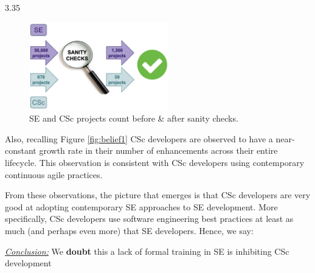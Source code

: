 \documentclass[conference,10pt]{IEEEtran}
\newenvironment{RQ}{\vspace{1mm}\begin{tcolorbox}[enhanced,width=3.4in,size=fbox,colback=red!5!white,drop shadow southeast,sharp corners]}{\end{tcolorbox}}
\begin{document}
\centerline{  3.35 }

\begin{figure}
  \centering
  \includegraphics[width=0.9\linewidth, height=1.5in]{img/sanity.png} 
  \caption{SE and CSc projects count before \& after sanity checks.}
  \label{fig:sanity}
  \vspace{-10pt}
\end{figure}
 Also, recalling Figure \ref{fig:belief1} CSc developers are observed to have a near-constant growth rate in their number of enhancements across their entire lifecycle. This observation is consistent with CSc developers using
  contemporary continuous agile practices. 

From these observations, the picture that emerges is that CSc developers are very good at adopting contemporary  SE approaches to SE development. More specifically, CSc developers
use software engineering best practices   at least as much (and perhaps even more) that SE developers. Hence, we say: 
\begin{RQ}
\textit{\underline{Conclusion:}} We \textbf{doubt} this a lack of formal training in SE is inhibiting CSc development
\end{RQ}


\end{document}
